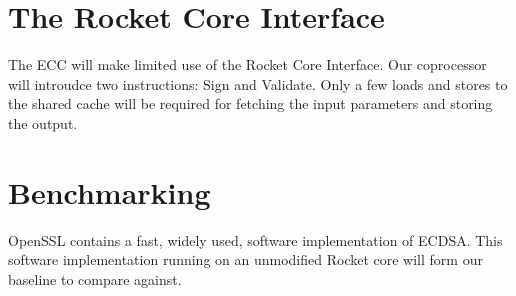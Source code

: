 \documentclass[twocolumn]{article}
\begin{document}
\section{The Rocket Core Interface}

The ECC will make limited use of the Rocket Core Interface. Our 
coprocessor will introudce two instructions: Sign and Validate. 
Only a few loads and stores to the shared cache will be required for 
fetching the input parameters and storing the output.  

\section{Benchmarking}

OpenSSL contains a fast, widely used, software implementation of
ECDSA\cite{kasper-openssl_ecc}.  This software implementation running
on an unmodified Rocket core will form our baseline to compare
against.




\end{document}
